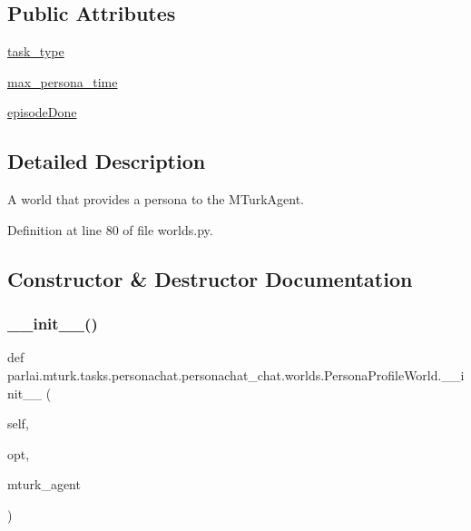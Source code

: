 \subsection*{Public Attributes}
\begin{DoxyCompactItemize}
\item 
\hyperlink{classparlai_1_1mturk_1_1tasks_1_1personachat_1_1personachat__chat_1_1worlds_1_1PersonaProfileWorld_a1f5c0449ba2b78995696e5d428ddc71a}{task\+\_\+type}
\item 
\hyperlink{classparlai_1_1mturk_1_1tasks_1_1personachat_1_1personachat__chat_1_1worlds_1_1PersonaProfileWorld_ab8a509dc9003c556658d8b07b4310803}{max\+\_\+persona\+\_\+time}
\item 
\hyperlink{classparlai_1_1mturk_1_1tasks_1_1personachat_1_1personachat__chat_1_1worlds_1_1PersonaProfileWorld_ae481c1bb5d65a01eba920cd88265e41b}{episode\+Done}
\end{DoxyCompactItemize}


\subsection{Detailed Description}
\begin{DoxyVerb}A world that provides a persona to the MTurkAgent.
\end{DoxyVerb}
 

Definition at line 80 of file worlds.\+py.



\subsection{Constructor \& Destructor Documentation}
\mbox{\label{classparlai_1_1mturk_1_1tasks_1_1personachat_1_1personachat__chat_1_1worlds_1_1PersonaProfileWorld_a0d3decd1783860bca545ff69f49a8629}} 
\subsubsection{\texorpdfstring{\+\_\+\+\_\+init\+\_\+\+\_\+()}{\_\_init\_\_()}}
{\footnotesize\ttfamily def parlai.\+mturk.\+tasks.\+personachat.\+personachat\+\_\+chat.\+worlds.\+Persona\+Profile\+World.\+\_\+\+\_\+init\+\_\+\+\_\+ (\begin{DoxyParamCaption}\item[{}]{self,  }\item[{}]{opt,  }\item[{}]{mturk\+\_\+agent }\end{DoxyParamCaption})}



